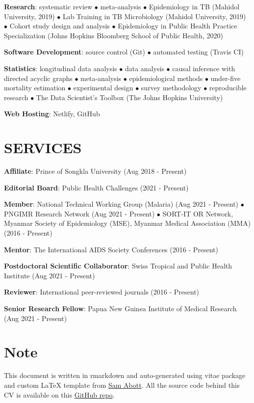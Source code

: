 \documentclass[11pt,a4paper,]{awesome-cv}
\begin{document}
\textbf{Research}: systematic review \(\bullet\) meta-analysis
\(\bullet\) Epidemiology in TB (Mahidol University, 2019) \(\bullet\)
Lab Training in TB Microbiology (Mahidol University, 2019) \(\bullet\)
Cohort study design and analysis \(\bullet\) Epidemiology in Public
Health Practice Specialization (Johns Hopkins Bloomberg School of Public
Health, 2020)

\textbf{Software Development}: source control (Git) \(\bullet\)
automated testing (Travis CI)

\textbf{Statistics}: longitudinal data analysis \(\bullet\) data
analysis \(\bullet\) causal inference with directed acyclic graphs
\(\bullet\) meta-analysis \(\bullet\) epidemiological methods
\(\bullet\) under-five mortality estimation \(\bullet\) experimental
design \(\bullet\) survey methodology \(\bullet\) reproducible research
\(\bullet\) The Data Scientist's Toolbox (The Johns Hopkins University)

\textbf{Web Hosting}: Netlify, GitHub

\hypertarget{services}{%
\section{SERVICES}\label{services}}

\textbf{Affiliate}: Prince of Songkla University (Aug 2018 - Present)

\textbf{Editorial Board}: Public Health Challenges (2021 - Present)

\textbf{Member}: National Technical Working Group (Malaria) (Aug 2021 -
Present) \(\bullet\) PNGIMR Research Network (Aug 2021 - Present)
\(\bullet\) SORT-IT OR Network, Myanmar Society of Epidemiology (MSE),
Myanmar Medical Association (MMA) (2016 - Present)

\textbf{Mentor}: The International AIDS Society Conferences (2016 -
Present)

\textbf{Postdoctoral Scientific Collaborator}: Swiss Tropical and Public
Health Institute (Aug 2021 - Present)

\textbf{Reviewer}: International peer-reviewed journals (2016 - Present)

\textbf{Senior Research Fellow}: Papua New Guinea Institute of Medical
Research (Aug 2021 - Present)

\hypertarget{note}{%
\section{Note}\label{note}}

This document is written in rmarkdown and auto-generated using vitae
package and custom LaTeX template from
\href{https://github.com/seabbs/cv}{Sam Abott}. All the source code
behind this CV is available on this
\href{https://github.com/myominnoo/CV}{GitHub repo}.
\end{document}
